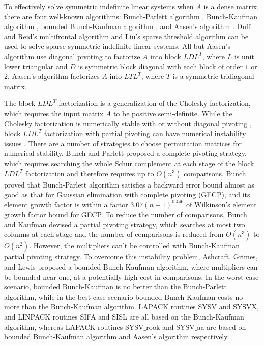 \documentclass[11pt]{article}
\begin{document}
To effectively solve symmetric indefinite linear systems when $A$ is a dense matrix, there are four well-known algorithms: Bunch-Parlett algorithm \cite{bunch1971direct}, Bunch-Kaufman algorithm \cite{bunch1977some}, bounded Bunch-Kaufman algorithm \cite{ashcraft1998accurate}, and Aasen's algorithm \cite{aasen1971reduction}. Duff and Reid's multifrontal algorithm \cite{duff1983multifrontal} and Liu's sparse threshold algorithm \cite{liu1987partial} can be used to solve sparse symmetric indefinite linear systems. All but Aasen's algorithm use diagonal pivoting to factorize $A$ into block $LDL^T$, where $L$ is unit lower triangular and $D$ is symmetric block diagonal with each block of order $1$ or $2$. Aasen's algorithm factorizes $A$ into $LTL^T$, where $T$ is a symmetric tridiagonal matrix.

The block $LDL^T$ factorization is a generalization of the Cholesky factorization, which requires the input matrix $A$ to be positive semi-definite. While the Cholesky factorization is numerically stable with or without diagonal pivoting \cite{golub2012matrix}, block $LDL^T$ factorization with partial pivoting can have numerical instability issues \cite{ashcraft1998accurate,higham1997stability}. There are a number of strategies to choose permutation matrices for numerical stability. Bunch and Parlett \cite{bunch1971direct} proposed a complete pivoting strategy, which requires searching the whole Schur complement at each stage of the block $LDL^T$ factorization and therefore requires up to $O(n^3)$ comparisons. Bunch \cite{bunch1971analysis} proved that Bunch-Parlett algorithm satisfies a backward error bound almost as good as that for Gaussian elimination with complete pivoting (GECP), and its element growth factor is within a factor $3.07(n-1)^{0.446}$ of Wilkinson's element growth factor bound \cite{wilkinson1961error} for GECP. To reduce the number of comparisons, Bunch and Kaufman devised a partial pivoting strategy, which searches at most two columns at each stage and the number of comparisons is reduced from $O(n^3)$ to $O(n^2)$. However, 
the multipliers can't be controlled with Bunch-Kaufman partial pivoting strategy. To overcome this instability problem,  Ashcraft, Grimes, and Lewis \cite{ashcraft1998accurate} proposed a bounded Bunch-Kaufman algorithm, where multipliers can be bounded near one, at a potentially high cost in comparisons. In the worst-case scenario, bounded Bunch-Kaufman is no better than the Bunch-Parlett algorithm, while in the best-case scenario bounded Bunch-Kaufman costs no more than the Bunch-Kaufman algorithm. LAPACK \cite{anderson1999lapack} routines SYSV and SYSVX, and LINPACK \cite{dongarra1979linpack} routines SIFA and SISL are all based on the Bunch-Kaufman algorithm, whereas LAPACK routines SYSV$\_$rook and SYSV$\_$aa are based on bounded Bunch-Kaufman algorithm and Aasen's algorithm respectively.
\end{document}
